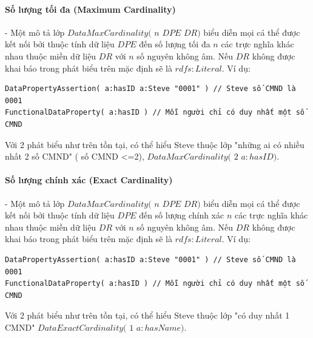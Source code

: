 \paragraph{Số lượng tối đa (Maximum Cardinality)} - Một mô tả lớp $DataMaxCardinality($ $n$ $DPE$ $DR)$ biểu diễn mọi cá thể được kết nối bởi thuộc tính dữ liệu $DPE$ đến số lượng tối đa $n$ các trực nghĩa khác nhau thuộc miền dữ liệu  $DR$ với $n$ số nguyên không âm. Nếu $DR$ không được khai báo trong phát biểu trên mặc định sẽ là $rdfs:Literal$. Ví dụ:
\begin{verbatim}
DataPropertyAssertion( a:hasID a:Steve "0001" ) // Steve số CMND là 0001
FunctionalDataProperty( a:hasID ) // Mỗi người chỉ có duy nhất một số CMND
\end{verbatim}
Với 2 phát biểu như trên tồn tại, có thể hiểu Steve thuộc lớp "những ai có nhiều nhất 2 số CMND" ( số CMND <=2), $DataMaxCardinality($ $2$ $a:hasID)$.

\paragraph{Số lượng chính xác (Exact Cardinality)} - Một mô tả lớp $DataMaxCardinality($ $n$ $DPE$ $DR)$  biểu diễn mọi cá thể được kết nối bởi thuộc tính dữ liệu $DPE$ đến số lượng chính xác $n$ các trực nghĩa khác nhau thuộc miền dữ liệu  $DR$ với $n$ số nguyên không âm. Nếu $DR$ không được khai báo trong phát biểu trên mặc định sẽ là $rdfs:Literal$. Ví dụ:
\begin{verbatim}
DataPropertyAssertion( a:hasID a:Steve "0001" ) // Steve số CMND là 0001
FunctionalDataProperty( a:hasID ) // Mỗi người chỉ có duy nhất một số CMND
\end{verbatim}
Với 2 phát biểu như trên tồn tại, có thể hiểu Steve thuộc lớp "có duy nhất 1 CMND" $DataExactCardinality($ $1$ $a:hasName)$.


